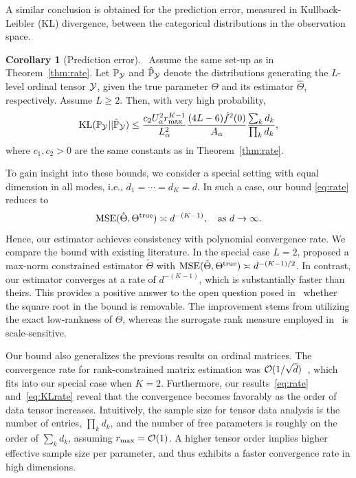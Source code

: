\documentclass{article}
\theoremstyle{plain}
\theoremstyle{definition}
\newtheorem{cor}{Corollary}
\begin{document}
A similar conclusion is obtained for the prediction error, measured in Kullback-Leibler (KL) divergence, between the categorical distributions in the observation space. 
\begin{cor}[Prediction error]~\label{cor:prediction}
Assume the same set-up as in Theorem~\ref{thm:rate}. Let $\mathbb{P}_{\mathcal{Y}}$ and $\hat{\mathbb{P}}_{\mathcal{Y}}$ denote the distributions generating the $L$-level ordinal tensor $\mathcal{Y}$, given the true parameter $\Theta$ and its estimator $\hat \Theta$, respectively. Assume $L\geq 2$. Then, with very high probability, 
\begin{equation}\label{eq:KLrate}
\text{KL}(\mathbb{P}_{\mathcal{Y}} || \hat{\mathbb{P}}_{\mathcal{Y}}) \leq  {c_2 U^2_\alpha r_{\max}^{K-1}  \over L^2_\alpha } {(4L-6)\dot{f}^2(0)  \over A_\alpha} {\sum_kd_k\over  \prod_k d_k},
\end{equation}
where $c_1, c_2>0$ are the same constants as in Theorem~\ref{thm:rate}.  
\end{cor}
To gain insight into these bounds, we consider a special setting with equal dimension in all modes, i.e., $d_1=\cdots=d_K=d$. In such a case, our bound \eqref{eq:rate} reduces to
\begin{equation*}\label{eq:ours}
\text{MSE}(\hat \Theta, \Theta^{\text{true}}) \asymp d^{-(K-1)}, \quad \text{as}\ d\to \infty.
\end{equation*}
Hence, our estimator achieves consistency with polynomial convergence rate. We compare the bound with existing literature. In the special case $L=2$, \citet{ghadermarzy2018learning} proposed a max-norm constrained estimator $\tilde{\Theta}$ with $\text{MSE}(\tilde{\Theta}, \Theta^{\text{true}}) \asymp  d^{-(K-1)/2}$. In contrast, our estimator converges at a rate of $d^{-(K-1)}$, which is substantially faster than theirs. This provides a positive answer to the open question posed in~\citet{ghadermarzy2018learning} whether the square root in the bound is removable. The improvement stems from utilizing the exact low-rankness of $\Theta$, whereas the surrogate rank measure employed in~\citet{ghadermarzy2018learning} is scale-sensitive.

Our bound also generalizes the previous results on ordinal matrices. The convergence rate for rank-constrained matrix estimation was $\mathcal{O}(1/\sqrt{d})$~\citep{bhaskar2016probabilistic}, which fits into our special case when $K=2$. Furthermore, our results~\eqref{eq:rate} and~\eqref{eq:KLrate} reveal that the convergence becomes favorably as the order of data tensor increases. Intuitively, the sample size for tensor data analysis is the number of entries, $\prod_k d_k$, and the number of free parameters is roughly on the order of $\sum_{k}d_k$, assuming $r_{\max}=\mathcal{O}(1)$. A higher tensor order implies higher effective sample size per parameter, and thus exhibits a faster convergence rate in high dimensions. 
\end{document}
